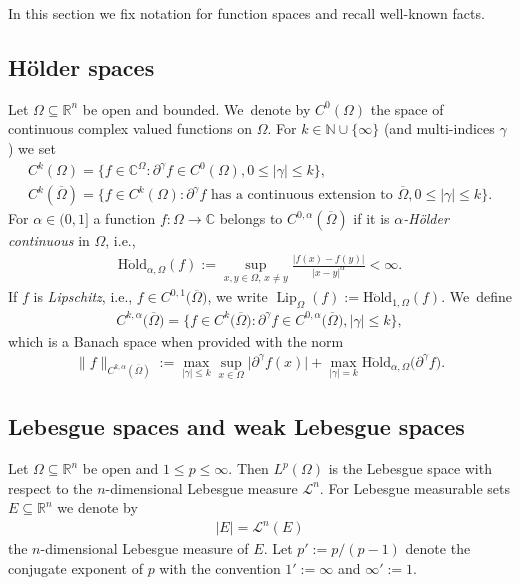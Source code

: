 \documentclass[11pt]{article}
\numberwithin{equation}{section}
\numberwithin{equation}{section}
\def\al{\alpha}
\def\ga{\gamma}
\def\Om{\Omega}
\def\C{\mathbb{C}}
\def\N{\mathbb{N}}
\def\R{\mathbb{R}}
\def\cL{\mathcal{L}}
\def\p{\partial}
\def\ol{\overline}
\def\Hoeld{\on{H\ddot{o}ld}}
\def\Lip{\on{Lip}}
\let\on=\operatorname
\begin{document}
In this section we fix notation for function spaces and recall well-known facts.

\subsection{H\"older spaces}

Let $\Om \subseteq \R^n$ be open and bounded. We~denote by $C^0(\Om)$ the space of continuous complex valued functions on $\Om$.
For $k \in \N \cup \{\infty\}$ (and multi-indices $\ga$) we set
\begin{gather*}
 C^k(\Om)= \big\{f \in \C^\Om \colon \p^\ga f \in C^0(\Om), 0 \le |\ga| \le k\big\},
 \\
 C^k(\overline \Om) = \big\{f \in C^k(\Om) \colon \p^\ga f \text{ has a continuous extension to } \overline \Om, 0 \le |\ga| \le k\big\}.
\end{gather*}
For $\al \in (0,1]$ a function $f \colon \Om \to \C$ belongs to $C^{0,\al}(\overline \Om)$ if it is \emph{$\al$-H\"older continuous}
in $\Om$, i.e.,
\begin{gather*}
\Hoeld_{\al,\Om}(f) := \sup_{x,y \in \Om,\, x \ne y} \frac{|f(x)-f(y)|}{|x-y|^\al} < \infty.
\end{gather*}
If $f$ is \emph{Lipschitz}, i.e., $f \in C^{0,1}\big(\ol \Om\big)$, we write
$\Lip_\Om (f) :=\Hoeld_{1,\Om}(f)$. We~define
\begin{gather*}
 C^{k,\al}\big(\overline \Om\big) =\big \{f \in C^k\big(\overline \Om\big) \colon \p^\ga f \in C^{0,\al}\big(\overline \Om\big), |\ga|\le k\big\},
\end{gather*}
which is a Banach space when provided with the norm
\begin{gather*}
\|f\|_{C^{k,\al}(\overline \Om)}
:= \max_{|\ga| \le k} \sup_{x \in \Om} \big|\p^\ga f(x)\big| + \max_{|\ga|=k} \Hoeld_{\al,\Om}\big(\p^\ga f\big).
\end{gather*}

\subsection{Lebesgue spaces and weak Lebesgue spaces} %

Let $\Om \subseteq \R^n$ be open and $1 \le p \le \infty$.
Then $L^p(\Om)$ is the Lebesgue space with respect to the $n$-dimensional Lebesgue measure $\cL^n$.
For Lebesgue measurable sets $E \subseteq \R^n$ we denote by
\begin{gather*}
 |E| = \cL^n(E)
\end{gather*}
the $n$-dimensional Lebesgue measure of $E$.
Let $p' := p/(p-1)$ denote the conjugate exponent of $p$
with the convention $1' := \infty$ and $\infty' :=1$.
\end{document}
